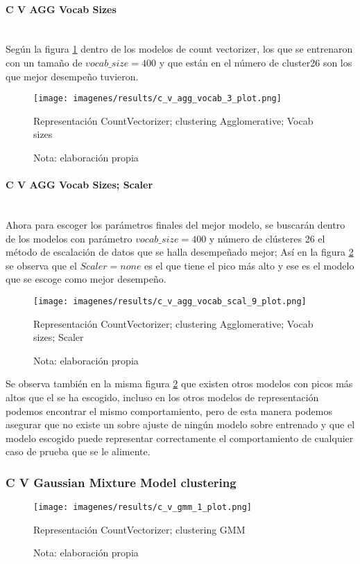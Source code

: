 \documentclass[12pt]{article}
\newcommand{\subsubsubsection}[1]{\paragraph{#1}\mbox{}\\}
\begin{document}
				\subsubsubsection{C V AGG Vocab Sizes}
				Según la figura \ref{fig:cv_agg_vocab_3} dentro de los modelos de count vectorizer, los que se entrenaron con un tamaño de $vocab\_size = 400$ y que están en el número de cluster26 son los que mejor desempeño tuvieron.
				
				\begin{figure}[H]
					\texttt{[image: imagenes/results/c\_v\_agg\_vocab\_3\_plot.png]}
					\centering
					\caption{Representación CountVectorizer; clustering Agglomerative; Vocab sizes}
					\caption*{\small Nota:  elaboración propia}
					\label{fig:cv_agg_vocab_3}
				\end{figure}
							
				\subsubsubsection{C V AGG Vocab Sizes; Scaler}
				Ahora para escoger los parámetros finales del mejor modelo, se buscarán dentro de los modelos con parámetro  $vocab\_size = 400$ y número de clústeres 26 el método de escalación de datos que se halla desempeñado mejor; Así en la figura \ref{fig:cv_agg_vocab_scal_9} se observa que el $Scaler = none$ es el que tiene el pico más alto y ese es el modelo que se escoge como mejor desempeño.
				
				\begin{figure}[H]
					\texttt{[image: imagenes/results/c\_v\_agg\_vocab\_scal\_9\_plot.png]}
					\centering
					\caption{Representación CountVectorizer; clustering Agglomerative; Vocab sizes; Scaler}
					\caption*{\small Nota:  elaboración propia}
					\label{fig:cv_agg_vocab_scal_9}
				\end{figure}
				
				Se observa también en la misma figura \ref{fig:cv_agg_vocab_scal_9} que existen otros modelos con picos más altos que el se ha escogido, incluso en los otros modelos de representación podemos encontrar el mismo comportamiento, pero de esta manera podemos asegurar que no existe un sobre ajuste de ningún modelo sobre entrenado y que el modelo escogido puede representar correctamente el comportamiento de cualquier caso de prueba que se le alimente.
							
			\subsubsection{C V Gaussian Mixture Model clustering}
			\begin{figure}[H]
				\texttt{[image: imagenes/results/c\_v\_gmm\_1\_plot.png]}
				\centering
				\caption{Representación CountVectorizer; clustering GMM}
				\caption*{\small Nota:  elaboración propia}
				\label{fig:cv_gmm_1}
			\end{figure}
			
\end{document}
